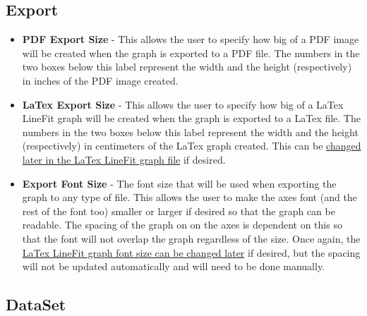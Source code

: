 \documentclass[titlepage,12pt]{article}
\begin{document}
\subsection{Export}
\label{subsec:export}

\begin{itemize}
\item \textbf{PDF Export Size} - This allows the user to specify how big of a PDF image will be created when the graph is exported to a PDF file. The numbers in the two boxes below this label represent the width and the height (respectively) in inches of the PDF image created.
\item \textbf{LaTex Export Size} - This allows the user to specify how big of a LaTex LineFit graph will be created when the graph is exported to a LaTex file. The numbers in the two boxes below this label represent the width and the height (respectively) in centimeters of the LaTex graph created. This can be \hyperref[sec:exlatexspace]{changed later in the LaTex LineFit graph file} if desired.
\item \textbf{Export Font Size} - The font size that will be used when exporting the graph to any type of file. This allows the user to make the axes font (and the rest of the font too) smaller or larger if desired so that the graph can be readable. The spacing of the graph on on the axes is dependent on this so that the font will not overlap the graph regardless of the size. Once again, the\hyperref[sec:exlatexspace]{ LaTex LineFit graph font size can be changed later} if desired, but the spacing will not be updated automatically and will need to be done manually.
\end{itemize}



\subsection{DataSet}
\label{subsec:dataset}
\end{document}
